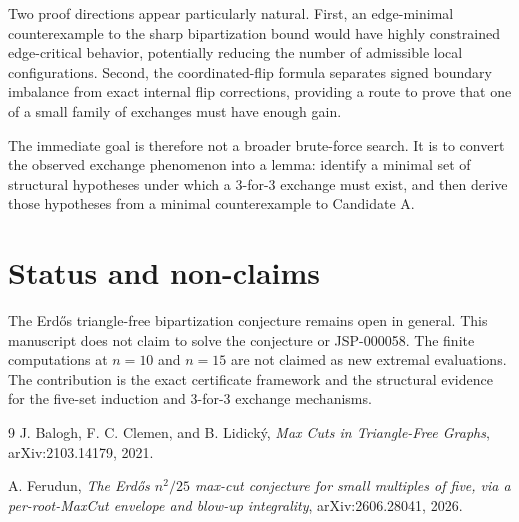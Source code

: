 \documentclass[11pt]{article}
\begin{document}
Two proof directions appear particularly natural.  First, an
edge-minimal counterexample to the sharp bipartization bound would have
highly constrained edge-critical behavior, potentially reducing the
number of admissible local configurations.  Second, the coordinated-flip
formula separates signed boundary imbalance from exact internal flip
corrections, providing a route to prove that one of a small family of
exchanges must have enough gain.

The immediate goal is therefore not a broader brute-force search.  It is
to convert the observed exchange phenomenon into a lemma: identify a
minimal set of structural hypotheses under which a 3-for-3 exchange must
exist, and then derive those hypotheses from a minimal counterexample to
Candidate A.

\section*{Status and non-claims}

The Erd\H{o}s triangle-free bipartization conjecture remains open in
general.  This manuscript does not claim to solve the conjecture or
JSP-000058.  The finite computations at $n=10$ and $n=15$ are not claimed
as new extremal evaluations.  The contribution is the exact certificate
framework and the structural evidence for the five-set induction and
3-for-3 exchange mechanisms.

\begin{thebibliography}{9}
J. Balogh, F. C. Clemen, and B. Lidick\'y,
\emph{Max Cuts in Triangle-Free Graphs},
arXiv:2103.14179, 2021.

A. Ferudun,
\emph{The Erd\H{o}s $n^2/25$ max-cut conjecture for small multiples of five,
via a per-root-MaxCut envelope and blow-up integrality},
arXiv:2606.28041, 2026.
\end{thebibliography}
\end{document}
